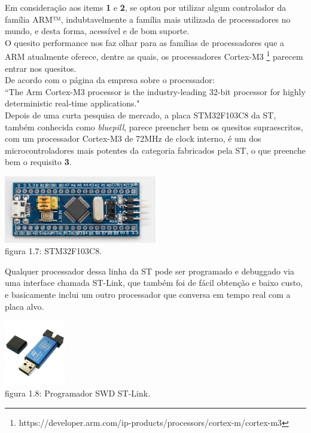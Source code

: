 \documentclass[11pt,a4paper]{report}
\begin{document}
	Em consideração aos items {\bf 1} e {\bf 2}, se optou por utilizar algum controlador da família ARM™, indubtavelmente a família mais utilizada de processadores no mundo, e desta forma, acessível e de bom suporte. \\
	
	O quesito performance nos faz olhar para as famílias de processadores que a ARM atualmente oferece, dentre as quais, os processadores Cortex-M3 \footnote{https://developer.arm.com/ip-products/processors/cortex-m/cortex-m3} parecem entrar nos quesitos. \\
	
	De acordo com o página da empresa sobre o processador:\\
	
	``The Arm Cortex-M3 processor is the industry-leading 32-bit processor for highly deterministic real-time applications."\\
	
	Depois de uma curta pesquisa de mercado, a placa STM32F103C8 da ST, também conhecida como {\it bluepill}, parece preencher bem os quesitos supraescritos, com um processador Cortex-M3 de 72MHz de clock interno, é um dos microcontroladores mais potentes da categoria fabricados pela ST, o que preenche bem o requisito {\bf 3}.\\
	\begin{center}
		\includegraphics[width=0.5\textwidth]{bluepill}\\
		\footnotesize{figura 1.7: STM32F103C8.}
	\end{center}

	
	Qualquer processador dessa linha da ST pode ser programado e debuggado via uma interface chamada ST-Link, que também foi de fácil obtenção e baixo custo, e basicamente inclui um outro processador que conversa em tempo real com a placa alvo.
	\begin{center}
	\includegraphics[width=0.2\textwidth]{stlink}\\
	\footnotesize{figura 1.8: Programador SWD ST-Link.}
	\end{center}
	
\end{document}
